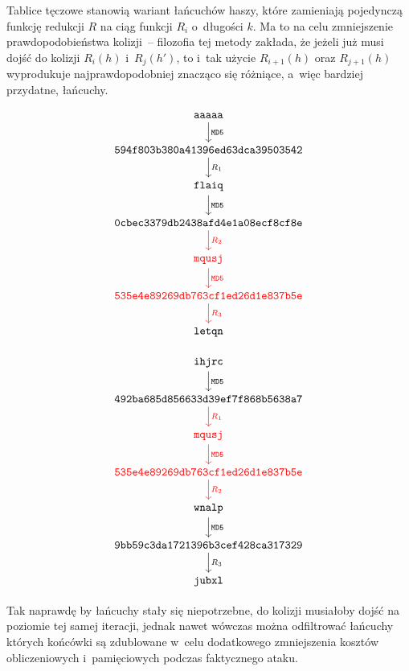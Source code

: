 Tablice tęczowe stanowią wariant łańcuchów haszy, które zamieniają pojedynczą
funkcję redukcji $R$ na ciąg funkcji $R_i$ o~długości $k$. Ma to na celu
zmniejszenie prawdopodobieństwa kolizji~-- filozofia tej metody zakłada, że
jeżeli już musi dojść do kolizji $R_i(h)$ i~$R_j(h')$, to i~tak użycie
$R_{i+1}(h)$ oraz $R_{j+1}(h)$ wyprodukuje najprawdopodobniej znacząco się
różniące, a~więc bardziej przydatne, łańcuchy.

\begin{multicols}{2}
    \[
    \begin{tikzcd}
        \mathtt{aaaaa} \arrow{d}{\mathtt{MD5}} \\
        \mathtt{594f803b380a41396ed63dca39503542} \arrow{d}{R_1} \\
        \mathtt{flaiq} \arrow{d}{\mathtt{MD5}} \\
        \mathtt{0cbec3379db2438afd4e1a08ecf8cf8e} \arrow[color=red]{d}{R_2} \\
        \mathtt{\textcolor{red}{mqusj}} \arrow[color=red]{d}{\mathtt{MD5}} \\
        \mathtt{\textcolor{red}{535e4e89269db763cf1ed26d1e837b5e}} \arrow[color=red]{d}{R_3} \\
        \mathtt{letqn}
    \end{tikzcd}
    \]

\columnbreak

    \[
    \begin{tikzcd}
        \mathtt{ihjrc} \arrow{d}{\mathtt{MD5}} \\
        \mathtt{492ba685d856633d39ef7f868b5638a7} \arrow[color=red]{d}{R_1} \\
        \mathtt{\textcolor{red}{mqusj}} \arrow[color=red]{d}{\mathtt{MD5}} \\
        \mathtt{\textcolor{red}{535e4e89269db763cf1ed26d1e837b5e}} \arrow[color=red]{d}{R_2} \\
        \mathtt{wnalp} \arrow{d}{\mathtt{MD5}} \\
        \mathtt{9bb59c3da1721396b3cef428ca317329} \arrow{d}{R_3} \\
        \mathtt{jubxl}
    \end{tikzcd}
    \]
\end{multicols}

Tak naprawdę by łańcuchy stały się niepotrzebne, do kolizji musiałoby dojść
na poziomie tej samej iteracji, jednak nawet wówczas można odfiltrować łańcuchy
których końcówki są zdublowane w~celu dodatkowego zmniejszenia kosztów
obliczeniowych i~pamięciowych podczas faktycznego ataku.

